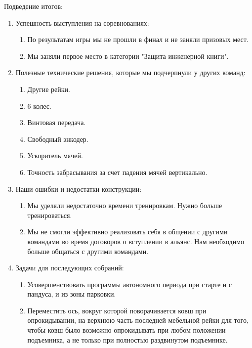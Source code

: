 Подведение итогов:
\begin{enumerate}
  \item Успешность выступления на соревнованиях:
  \begin{enumerate}
	\item По результатам игры мы не прошли в финал и не заняли призовых мест.
	
	\item Мы заняли первое место в категории "Защита инженерной книги".
	
  \end{enumerate}
  
  \item Полезные технические решения, которые мы подчерпнули у других команд:
  \begin{enumerate}
	\item Другие рейки.
	
	\item 6 колес.
	
	\item Винтовая передача.
	
	\item Свободный энкодер.
	
	\item Ускоритель мячей.
	
	\item Точность забрасывания за счет падения мячей вертикально.
	
  \end{enumerate}
  
  \item Наши ошибки и недостатки конструкции:
  \begin{enumerate}
  	\item Мы уделяли недостаточно времени тренировкам. Нужно больше тренироваться.
  	
  	\item Мы не смогли эффективно реализовать себя в общении с другими командами во время договоров о вступлении в альянс. Нам необходимо больше общаться с другими командами.
  	
  \end{enumerate}
  
  \item Задачи для последующих собраний:
  \begin{enumerate}
  	\item Усовершенствовать программы автономного периода при старте и с пандуса, и из зоны парковки.
  	
  	\item Переместить ось, вокруг которой поворачивается ковш при опрокидывании, на верхнюю часть последней мебельной рейки для того, чтобы ковш было возможно опрокидывать при любом положении подъемника, а не только при полностью раздвинутом подъемнике.
  	

\end{enumerate}
\end{enumerate}
